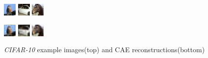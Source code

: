 \documentclass{article}
\begin{document}
    \begin{figure}[h]
      \centering
      \includegraphics[width=0.15\linewidth]{../graphics/reconstructions/cifar/input_00.png}
      \includegraphics[width=0.15\linewidth]{../graphics/reconstructions/cifar/input_01.png}
      \includegraphics[width=0.15\linewidth]{../graphics/reconstructions/cifar/input_02.png}

      \includegraphics[width=0.15\linewidth]{../graphics/reconstructions/cifar/reconstruction_00.png}
      \includegraphics[width=0.15\linewidth]{../graphics/reconstructions/cifar/reconstruction_01.png}
      \includegraphics[width=0.15\linewidth]{../graphics/reconstructions/cifar/reconstruction_02.png}

      \caption{\emph{CIFAR-10} example images(top) and CAE reconstructions(bottom)}
      \label{fig:cifar_reconstructions}

    \end{figure}
\end{document}
